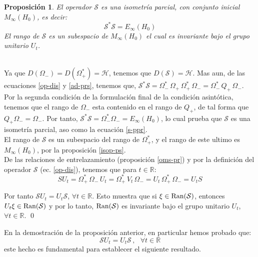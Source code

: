\documentclass[12pt]{book}
\numberwithin{equation}{chapter}
\newtheorem{proposition}[theorem]{Proposici\'on}
\def\n{\noindent}
\def\R{\mathbb{R}}
\def\S{\mathcal{S}}
\def\H{\mathcal{H}}
\def\O{\Omega}
\begin{document}
\begin{proposition}
El operador $\S$ es una isometr\'ia parcial, con conjunto inicial $M_{\infty}(H_{0})$, es decir:
\begin{equation}\label{s-ppr}
\S^{*} \S = E_{\infty}(H_{0})
\end{equation}
El rango de $\S$ es un subespacio de $M_{\infty}(H_{0})$ el cual es invariante bajo el grupo unitario $U_{t}$.
\end{proposition}
\n {\bf Demostraci\'on}\\
Ya que $D(\O_{-})=D(\O_{+}^{*})=\H $, tenemos que $D(\S)=\H$. Mas aun, de las ecuaciones \eqref{op-dis} y \eqref{ad-prs}, tenemos que, $\S^{*} \S= \O_{-}^{*}\, \O_{+} \, \O_{+}^{*} \, \O_{-}=\O_{-}^{*}\, Q_{+}\, \O_{-} $. Por la segunda condici\'on de la formulaci\'on final de la condici\'on asint\'otica, tenemos que el rango de $\O_{-}$ esta contenido en el rango de $Q_{+}$, de tal forma que $Q_{+} \O_{-} =\O_{-}$. Por tanto, $ \S^{*} \S = \O_{-}^{*} \O_{-}= E_{\infty}(H_{0}) $, lo cual prueba que $\S$ es una isometr\'ia parcial, aso como la ecuaci\'on \eqref{s-ppr}.\\

El rango de $\S$ es un subespacio del rango de $\O_{+}^{*}$, y el rango de este ultimo es $M_{\infty}(H_{0})$, por la proposici\'on \ref{isop-ps}.\\ 
De las relaciones de entrelazamiento (proposici\'on \ref{oms-pr}) y por la definici\'on del operador $\S$ (ec. \eqref{op-dis}), tenemos que para $t \in \R$:
$$ SU_{t}= \O_{+}^{*} \, \O_{-} \, U_{t}= \O_{+}^{*} \, V_{t}\, \O_{-}= U_{t}\, \O_{+}^{*}\, \O_{-}= U_{t} S $$

Por tanto $\S U_{t}=U_{t} \S$, $\forall t \in \R$. Esto muestra que si $\xi \in \hbox{Ran}(\S) $, entonces $U_{t} \xi \in \hbox{Ran}(\S)$ y por lo tanto, $\hbox{Ran}(\S)$ es invariante bajo el grupo unitario $U_{t}$, $\forall t \in \R$. \qed

\vspace{5 mm}

En la demostraci\'on de la proposici\'on anterior, en particular hemos probado que:
\begin{equation}\label{su-us}
\S U_{t}=U_{t} \S \,,\,\,\,\, \forall t \in \R
\end{equation}
este hecho es fundamental para establecer el siguiente resultado.
\end{document}
